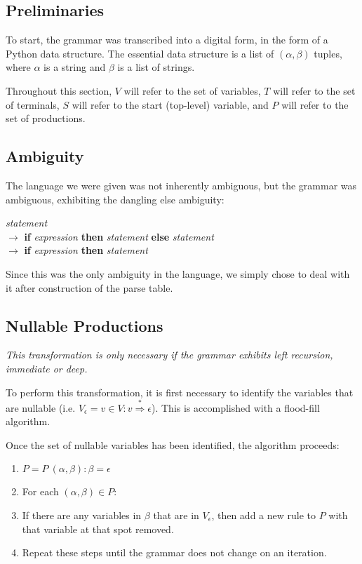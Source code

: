 \documentclass[titlepage]{article}
\newcommand{\deriv}{\overset{*}{\Rightarrow}}
\newcommand{\ep}{\epsilon}
\begin{document}
		\subsection{Preliminaries}
		To start, the grammar was transcribed into a digital form, in the form of a Python data structure. The essential data structure is a list of $(\alpha, \beta)$ tuples, where $\alpha$ is a string and $\beta$ is a list of strings.

		Throughout this section, $V$ will refer to the set of variables, $T$ will refer to the set of terminals, $S$ will refer to the start (top-level) variable, and $P$ will refer to the set of productions.

		\subsection{Ambiguity}
		The language we were given was not inherently ambiguous, but the grammar was ambiguous, exhibiting the dangling else ambiguity:

		\begin{center}
		\parbox{10cm}{
			\textit{statement} \\
			\phantom{1in} $\rightarrow$ \textbf{if} \textit{expression} \textbf{then} \textit{statement} \textbf{else} \textit{statement} \\
			\phantom{1in} $\rightarrow$ \textbf{if} \textit{expression} \textbf{then} \textit{statement}
		}
		\end{center}

		\noindent Since this was the only ambiguity in the language, we simply chose to deal with it after construction of the parse table.

		\subsection{Nullable Productions}
		\emph{This transformation is only necessary if the grammar exhibits left recursion, immediate or deep.}

		To perform this transformation, it is first necessary to identify the variables that are nullable (i.e. $V_\ep = {v \in V: v \deriv \ep}$). This is accomplished with a flood-fill algorithm.

		Once the set of nullable variables has been identified, the algorithm proceeds:
		\begin{enumerate}
			\item $P = P \ {(\alpha, \beta) : \beta = \ep}$
			\item For each $(\alpha, \beta) \in P$:
			\item If there are any variables in $\beta$ that are in $V_\ep$, then add a new rule to $P$ with that variable at that spot removed.
			\item Repeat these steps until the grammar does not change on an iteration.
		\end{enumerate}
\end{document}
